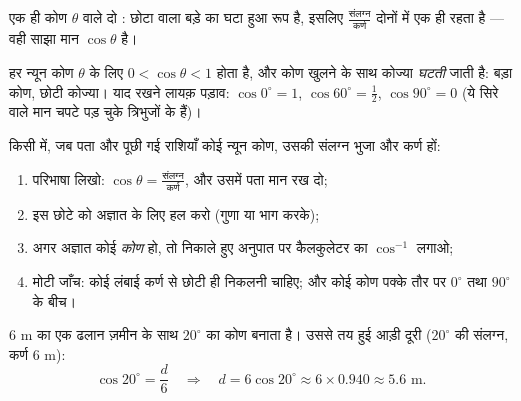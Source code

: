 \begin{omfigure}

{\small एक ही कोण $\theta$ वाले दो : छोटा वाला बड़े का
घटा हुआ रूप है, इसलिए
$\frac{\text{संलग्न}}{\text{कर्ण}}$ दोनों में एक ही रहता है ---
वही साझा मान $\cos\theta$ है।}
\end{omfigure}

\begin{proposition}[पहले मान और सीमाएँ]\label{prop:g8:cosine:bounds}
हर न्यून कोण $\theta$ के लिए $0 < \cos\theta < 1$ होता है, और कोण
खुलने के साथ कोज्या \emph{घटती} जाती है: बड़ा कोण, छोटी कोज्या।
याद रखने लायक़ पड़ाव: $\cos 0^\circ = 1$,
$\cos 60^\circ = \frac12$, $\cos 90^\circ = 0$ (ये सिरे वाले मान
चपटे पड़ चुके त्रिभुजों के हैं)।
\end{proposition}
\admitted

\begin{method}[कोज्या का इस्तेमाल]\label{met:g8:cosine:use}
किसी  में, जब पता और पूछी गई राशियाँ कोई न्यून कोण,
उसकी संलग्न भुजा और कर्ण हों:
\begin{enumerate}
  \item परिभाषा लिखो:
        $\cos\theta = \frac{\text{संलग्न}}{\text{कर्ण}}$, और उसमें
        पता मान रख दो;
  \item इस छोटे  को अज्ञात के लिए हल करो (गुणा या भाग करके);
  \item अगर अज्ञात कोई \emph{कोण} हो, तो निकाले हुए अनुपात पर
        कैलकुलेटर का $\cos^{-1}$ लगाओ;
  \item मोटी जाँच: कोई लंबाई कर्ण से छोटी ही निकलनी चाहिए; और कोई
        कोण पक्के तौर पर $0^\circ$ तथा $90^\circ$ के बीच।
\end{enumerate}
\end{method}

\begin{example}[कोई भुजा निकालना]\label{ex:g8:cosine:side}
$6$ m का एक ढलान ज़मीन के साथ $20^\circ$ का कोण बनाता है। उससे तय
हुई आड़ी दूरी ($20^\circ$ की संलग्न, कर्ण $6$ m):
\[
\cos 20^\circ = \frac{d}{6}
\quad\Longrightarrow\quad
d = 6 \cos 20^\circ \approx 6 \times 0.940 \approx 5.6 \text{ m}.
\]
\end{example}

